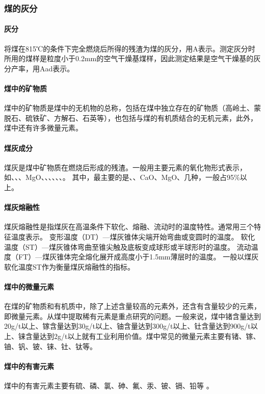 \documentclass[10pt,openany]{ctexbook}
\begin{document}
\subsubsection{煤的灰分}
 \paragraph{灰分}  将煤在815℃的条件下完全燃烧后所得的残渣为煤的灰分，用A表示。测定灰分时所用的煤样是粒度小于0.2mm的空气干燥基煤样，因此测定结果是空气干燥基的灰分产率，用Aad表示。
 \paragraph{煤中的矿物质} 煤中的矿物质是煤中的无机物的总称，包括在煤中独立存在的矿物质（高岭土、蒙脱石、硫铁矿、方解石、石英等），也包括与煤的有机质结合的无机元素，此外，煤中还有许多微量元素。
 \paragraph{煤灰成分} 煤灰是煤中矿物质在燃烧后形成的残渣。一般用主要元素的氧化物形式表示，如、、、MgO、、、、、、。 其中，最主要的是、、CaO、MgO、几种，一般占95\%以上。
 \paragraph{煤灰熔融性} 煤灰熔融性是指煤灰在高温条件下软化、熔融、流动时的温度特性。通常用三个特征温度表示。
变形温度（DT）—煤灰锥体尖端开始弯曲或变圆时的温度。
软化温度（ST）—煤灰锥体弯曲至锥尖触及底板变成球形或半球形时的温度。
流动温度（FT）—煤灰锥体完全熔化展开成高度小于1.5mm薄层时的温度。
一般以煤灰软化温度ST作为衡量煤灰熔融性的指标。
\paragraph{煤中的微量元素} 在煤的矿物质和有机质中，除了上述含量较高的元素外，还含有含量较少的元素，即微量元素。从煤中提取稀有元素是重点研究的问题。一般来说，煤中锗含量达到20g/t以上、镓含量达到30g/t以上、铀含量达到300g/t以上、钍含量达到900g/t以上、铼含量达到2g/t以上就有工业利用价值。煤中常见的微量元素主要有锗、镓、铀、钒、铍、铼、钍、钛等。
\paragraph{煤中的有害元素} 煤中的有害元素主要有硫、磷、氯、砷、氟、汞、铍、镉、铅等 。
\end{document}
